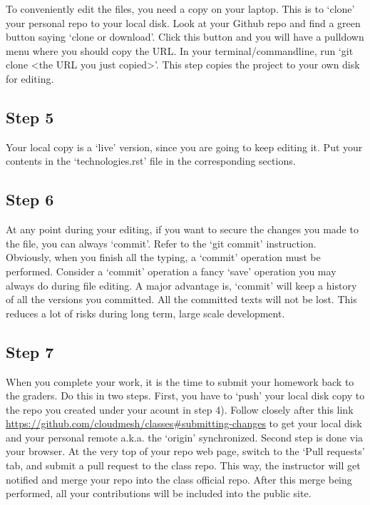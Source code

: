To conveniently edit the files, you need a copy on your laptop. This is
to `clone' your personal repo to your local disk. Look at your Github
repo and find a green button saying `clone or download'. Click this
button and you will have a pulldown menu where you should copy the URL.
In your terminal/commandline, run `git clone \textless{}the URL you just
copied\textgreater{}'. This step copies the project to your own disk for
editing.

\subsection{Step 5}\label{step-5}

Your local copy is a `live' version, since you are going to keep editing
it. Put your contents in the `technologies.rst' file in the
corresponding sections.

\subsection{Step 6}\label{step-6}

At any point during your editing, if you want to secure the changes you
made to the file, you can always `commit'. Refer to the `git commit'
instruction. Obviously, when you finish all the typing, a `commit'
operation must be performed. Consider a `commit' operation a fancy
`save' operation you may always do during file editing. A major
advantage is, `commit' will keep a history of all the versions you
committed. All the committed texts will not be lost. This reduces a lot
of risks during long term, large scale development.

\subsection{Step 7}\label{step-7}

When you complete your work, it is the time to submit your homework back
to the graders. Do this in two steps. First, you have to `push' your
local disk copy to the repo you created under your acount in step 4).
Follow closely after this link
\url{https://github.com/cloudmesh/classes\#submitting-changes} to get
your local disk and your personal remote a.k.a. the `origin'
synchronized. Second step is done via your browser. At the very top of
your repo web page, switch to the `Pull requests' tab, and submit a pull
request to the class repo. This way, the instructor will get notified
and merge your repo into the class official repo. After this merge being
performed, all your contributions will be included into the public site.
